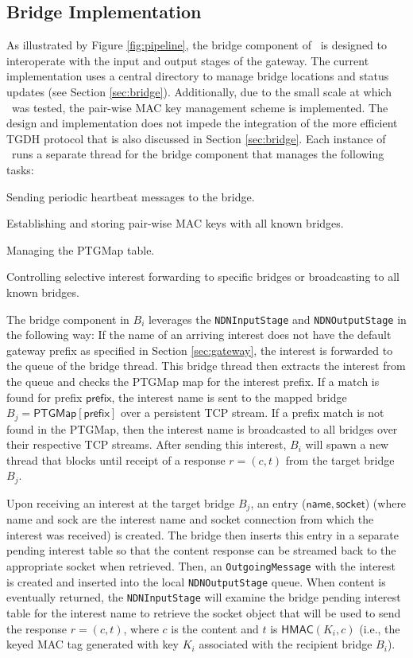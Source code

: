\subsection{Bridge Implementation}
As illustrated by Figure \ref{fig:pipeline}, the bridge component of \sink\ is designed to interoperate with the input and output stages of the gateway. The current implementation uses a central directory to manage bridge locations and status updates (see Section \ref{sec:bridge}). Additionally, due to the small scale at which \sink\ was tested, the pair-wise MAC key management scheme is implemented. The design and implementation does not impede the integration of the more efficient TGDH protocol that is also discussed in Section \ref{sec:bridge}. Each instance of \sink\ runs a separate thread for the bridge component that manages the following tasks:
\begin{compactitem}
	\item Sending periodic heartbeat messages to the bridge.
	\item Establishing and storing pair-wise MAC keys with all known bridges.
	\item Managing the {\sf PTGMap} table.
	\item Controlling selective interest forwarding to specific bridges or broadcasting to all known bridges.
\end{compactitem}

The bridge component in $B_i$ leverages the {\tt NDNInputStage} and {\tt NDNOutputStage} in the following way: If the name of an arriving interest does not have the default gateway prefix as specified in Section \ref{sec:gateway}, the interest is forwarded to the queue of the bridge thread. This bridge thread then extracts the interest from the queue and checks the {\sf PTGMap} map for the interest prefix. If a match is found for prefix $\mathsf{prefix}$, the interest name is sent to the mapped bridge $B_j = \mathsf{PTGMap}[\mathsf{prefix}]$ over a persistent TCP stream. If a prefix match is not found in the {\sf PTGMap}, then the interest name is broadcasted to all bridges over their respective TCP streams. After sending this interest, $B_i$ will spawn a new thread that blocks until receipt of a response $r = (c,t)$ from the target bridge $B_j$. 

Upon receiving an interest at the target bridge $B_j$, an entry ($\mathsf{name}, \mathsf{socket}$) (where {\sf name} and {\sf sock} are the interest name and socket connection from which the interest was received) is created. The bridge then inserts this entry in a separate pending interest table so that the content response can be streamed back to the appropriate socket when retrieved. Then, an {\tt OutgoingMessage} with the interest is created and inserted into the local {\tt NDNOutputStage} queue. When content is eventually returned, the {\tt NDNInputStage} will examine the bridge pending interest table for the interest name to retrieve the socket object that will be used to send the response $r = (c,t)$, where $c$ is the content and $t$ is $\mathsf{HMAC}(K_i, c)$ (i.e., the keyed MAC tag generated with key $K_i$ associated with the recipient bridge $B_i$).

